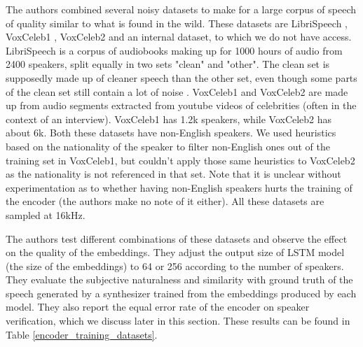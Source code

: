 \documentclass[a4paper, oneside, 12pt, english]{article}
\begin{document}
The authors combined several noisy datasets to make for a large corpus of speech of quality similar to what is found in the wild. These datasets are LibriSpeech \citep{LibriSpeech}, VoxCeleb1 \citep{VoxCeleb1}, VoxCeleb2 \citep{VoxCeleb2} and an internal dataset, to which we do not have access. LibriSpeech is a corpus of audiobooks making up for 1000 hours of audio from 2400 speakers, split equally in two sets "clean" and "other". The clean set is supposedly made up of cleaner speech than the other set, even though some parts of the clean set still contain a lot of noise \citep{LibriTTS}. VoxCeleb1 and VoxCeleb2 are made up from audio segments extracted from youtube videos of celebrities (often in the context of an interview). VoxCeleb1 has 1.2k speakers, while VoxCeleb2 has about 6k. Both these datasets have non-English speakers. We used heuristics based on the nationality of the speaker to filter non-English ones out of the training set in VoxCeleb1, but couldn't apply those same heuristics to VoxCeleb2 as the nationality is not referenced in that set. Note that it is unclear without experimentation as to whether having non-English speakers hurts the training of the encoder (the authors make no note of it either). All these datasets are sampled at 16kHz.

The authors test different combinations of these datasets and observe the effect on the quality of the embeddings. They adjust the output size of LSTM model (the size of the embeddings) to 64 or 256 according to the number of speakers. They evaluate the subjective naturalness and similarity with ground truth of the speech generated by a synthesizer trained from the embeddings produced by each model. They also report the equal error rate of the encoder on speaker verification, which we discuss later in this section. These results can be found in Table \ref{encoder_training_datasets}.
\end{document}
